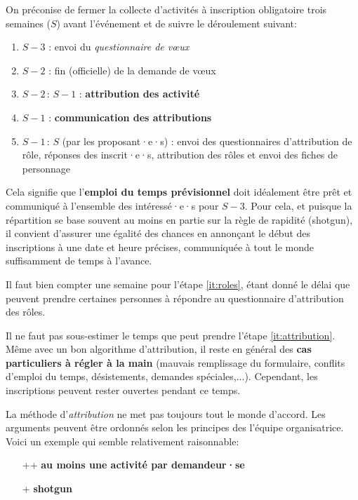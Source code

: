 On préconise de fermer la collecte d'activités à inscription obligatoire trois semaines ($S$) avant l'événement et de suivre le déroulement suivant:
\begin{enumerate}
    \item $S-3$ : envoi du \emph{questionnaire de vœux}
    \item $S-2$ : fin (officielle) de la demande de vœux
    \item\label{it:attribution} $S-2 \,:\, S-1$ : \textbf{attribution des activité}
    \item $S-1$ : \textbf{communication des attributions}
    \item\label{it:roles} $S-1 \,:\, S$ (par les proposant·e·s) : envoi des questionnaires d'attribution de rôle, réponses des inscrit·e·s, attribution des rôles et envoi des fiches de personnage
\end{enumerate}

Cela signifie que l'\textbf{emploi du temps prévisionnel} doit idéalement être prêt et communiqué à l'ensemble des intéressé·e·s pour $S-3$. Pour cela, et puisque la répartition se base souvent au moins en partie sur la règle de rapidité (shotgun), il convient d'assurer une égalité des chances en annonçant le début des inscriptions à une date et heure précises, communiquée à tout le monde suffisamment de temps à l'avance.

Il faut bien compter une semaine pour l'étape \ref{it:roles}, étant donné le délai que peuvent prendre certaines personnes à répondre au questionnaire d'attribution des rôles.

\begin{Attention}{}{}
Il ne faut pas sous-estimer le temps que peut prendre l'étape \ref{it:attribution}. Même avec un bon algorithme d'attribution, il reste en général des \textbf{cas particuliers à régler à la main} (mauvais remplissage du formulaire, conflits d'emploi du temps, désistements, demandes spéciales,...). Cependant, les inscriptions peuvent rester ouvertes pendant ce temps.
\end{Attention}

La méthode d'\emph{attribution} ne met pas toujours tout le monde d'accord. Les arguments peuvent être ordonnés selon les principes des l'équipe organisatrice. Voici un exemple qui semble relativement raisonnable:

\begin{itemize}
    \item[++] \textbf{au moins une activité par demandeur·se}
    \item[+] \textbf{shotgun}
\end{itemize}


